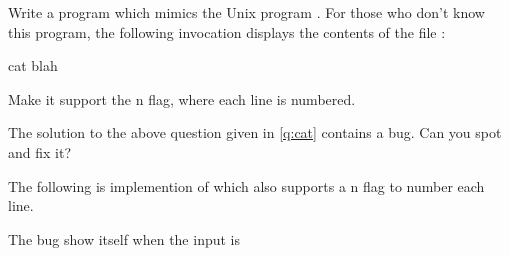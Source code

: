 \begin{Exercise}[title={Cat},difficulty=1]
\label{ex:cat}
\Question \label{ex:cat q1} Write a program which mimics the Unix program
. For those who don't know this program, the following 
invocation displays the contents of the file :
\begin{display}
\pr cat blah
\end{display}

\Question Make it support the \-n flag, where each line is
numbered.

\Question The solution to the above question given in \ref{q:cat} contains a
bug. Can you spot and fix it?
\end{Exercise}

\begin{Answer}
\Question The following is implemention of  which also 
\label{q:cat}
supports a \-n flag to number each line.

\showremarks

\Question The bug show itself when the input is
\end{Answer}
